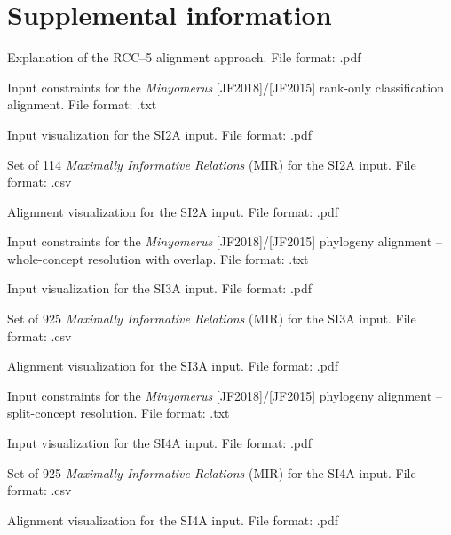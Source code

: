 \documentclass[fleqn,10pt,lineno]{wlpeerj} %
\begin{document}
\section*{Supplemental information}
		\begin{description}[itemsep=-1ex]
			\item[\texttt{SI1}] Explanation of the RCC--5 alignment approach. File format: .pdf
			\item[\texttt{SI2A}] Input constraints for the \textit{Minyomerus} [JF2018]/[JF2015] rank-only classification alignment. File format: .txt
			\item[\texttt{SI2B}] Input visualization for the SI2A input. File format: .pdf
			\item[\texttt{SI2C}] Set of 114 \textit{Maximally Informative Relations} (MIR) for the SI2A input. File format: .csv
			\item[\texttt{SI2D}] Alignment visualization for the SI2A input. File format: .pdf
			\item[\texttt{SI3A}] Input constraints for the \textit{Minyomerus} [JF2018]/[JF2015] phylogeny alignment -- whole-concept resolution with overlap. File format: .txt
			\item[\texttt{SI3B}] Input visualization for the SI3A input. File format: .pdf
			\item[\texttt{SI3C}] Set of 925 \textit{Maximally Informative Relations} (MIR) for the SI3A input. File format: .csv
			\item[\texttt{SI3D}] Alignment visualization for the SI3A input. File format: .pdf
			\item[\texttt{SI4A}] Input constraints for the \textit{Minyomerus} [JF2018]/[JF2015] phylogeny alignment -- split-concept resolution. File format: .txt
			\item[\texttt{SI4B}] Input visualization for the SI4A input. File format: .pdf
			\item[\texttt{SI4C}] Set of 925 \textit{Maximally Informative Relations} (MIR) for the SI4A input. File format: .csv
			\item[\texttt{SI4D}] Alignment visualization for the SI4A input. File format: .pdf
		\end{description}
		
\newpage


\nocite{*}

\newpage
\end{document}
